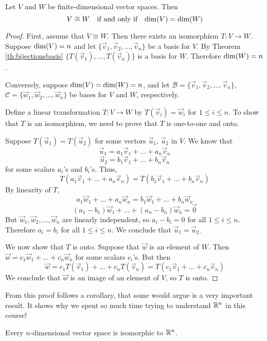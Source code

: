 \documentclass{ximera}
\begin{document}
\begin{theorem}\label{th:ndimspacesisorn}
Let $V$ and $W$ be finite-dimensional vector spaces. Then
$$V\cong W\quad\text{if and only if}\quad \textnormal{dim}(V)=\textnormal{dim}(W)$$
\end{theorem}
\begin{proof}
First, assume that $V\cong W$.  Then there exists an isomorphism $T:V\rightarrow W$.  Suppose $\textnormal{dim}(V)=n$ and let $\{\vec{v}_1,\vec{v}_2,\ldots ,\vec{v}_n\}$ be a basis for $V$. By Theorem \ref{th:bijectionsbasis} $\{T(\vec{v}_1),\ldots ,T(\vec{v}_n)\}$ is a basis for $W$. Therefore $\textnormal{dim}(W)=n$.

Conversely, suppose $\textnormal{dim}(V)=\textnormal{dim}(W)=n$, and let $\mathcal{B}=\{\vec{v}_1,\vec{v}_2,\ldots ,\vec{v}_n\}$, $\mathcal{C}=\{\vec{w}_1,\vec{w}_2,\ldots ,\vec{w}_n\}$ be bases for $V$ and $W$, respectively.

Define a linear transformation $T:V\rightarrow W$ by $T(\vec{v}_i)=\vec{w}_i$ for $1\leq i\leq n$.  To show that $T$ is an isomorphism, we need to prove that $T$ is one-to-one and onto.

Suppose $T(\vec{u}_1)=T(\vec{u}_2)$ for some vectors $\vec{u}_1$, $\vec{u}_2$ in $V$.  We know that
$$\vec{u}_1=a_1\vec{v}_1+\ldots +a_n\vec{v}_n$$
$$\vec{u}_2=b_1\vec{v}_1+\ldots +b_n\vec{v}_n$$
for some scalars $a_i$'s and $b_i$'s.  Thus,
$$T(a_1\vec{v}_1+\ldots +a_n\vec{v}_n)=T(b_1\vec{v}_1+\ldots +b_n\vec{v}_n)$$
By linearity of $T$,
$$a_1\vec{w}_1+\ldots +a_n\vec{w}_n=b_1\vec{w}_1+\ldots +b_n\vec{w}_n$$
$$(a_1-b_1)\vec{w}_1+\ldots +(a_n-b_n)\vec{w}_n=\vec{0}$$
But $\vec{w}_1,\vec{w}_2,\ldots ,\vec{w}_n$ are linearly independent, so $a_i-b_i=0$ for all $1\leq i\leq n$.  Therefore $a_i=b_i$ for all $1\leq i\leq n$.  We conclude that $\vec{u}_1=\vec{u}_2$.

We now show that $T$ is onto. Suppose that $\vec{w}$ is an element of $W$.  Then $\vec{w}=c_1\vec{w}_1+\ldots +c_n\vec{w}_n$ for some scalars $c_i$'s.  But then
$$\vec{w}=c_1T(\vec{v}_1)+\ldots +c_nT(\vec{v}_n)=T(c_1\vec{v}_1+\ldots +c_n\vec{v}_n)$$
We conclude that $\vec{w}$ is an image of an element of $V$, so $T$ is onto.

\end{proof}

From this proof follows a corollary, that some would argue is a very important result.  It shows why we spent so much time trying to understand $\mathbb{R}^n$ in this course!

\begin{corollary}\label{cor:ndimisotorn}
Every $n$-dimensional vector space is isomorphic to $\mathbb{R}^n$.
\end{corollary}
\end{document}
